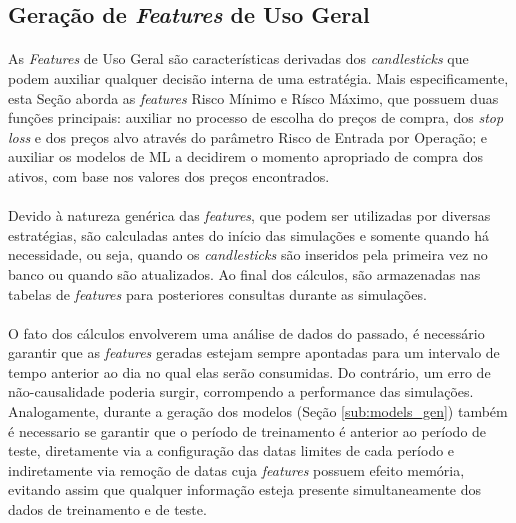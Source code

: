 \FloatBarrier
\subsection{Geração de \textit{Features} de Uso Geral}
\label{sub:features}

\paragraph{} As \textit{Features} de Uso Geral são características derivadas dos \textit{candlesticks} que podem auxiliar qualquer decisão interna de uma estratégia. Mais especificamente, esta Seção aborda as \textit{features} Risco Mínimo e Rísco Máximo, que possuem duas funções principais: auxiliar no processo de escolha do preços de compra, dos \textit{stop loss} e dos preços alvo através do parâmetro Risco de Entrada por Operação; e auxiliar os modelos de ML a decidirem o momento apropriado de compra dos ativos, com base nos valores dos preços encontrados.

\paragraph{} Devido à natureza genérica das \textit{features}, que podem ser utilizadas por diversas estratégias, são calculadas antes do início das simulações e somente quando há necessidade, ou seja, quando os \textit{candlesticks} são inseridos pela primeira vez no banco ou quando são atualizados. Ao final dos cálculos, são armazenadas nas tabelas de \textit{features} para posteriores consultas durante as simulações.

\paragraph{} O fato dos cálculos envolverem uma análise de dados do passado, é necessário garantir que as \textit{features} geradas estejam sempre apontadas para um intervalo de tempo anterior ao dia no qual elas serão consumidas. Do contrário, um erro de não-causalidade poderia surgir, corrompendo a performance das simulações. Analogamente, durante a geração dos modelos (Seção \ref{sub:models_gen}) também é necessario se garantir que o período de treinamento é anterior ao período de teste, diretamente via a configuração das datas limites de cada período e indiretamente via remoção de datas cuja \textit{features} possuem efeito memória, evitando assim que qualquer informação esteja presente simultaneamente dos dados de treinamento e de teste.

